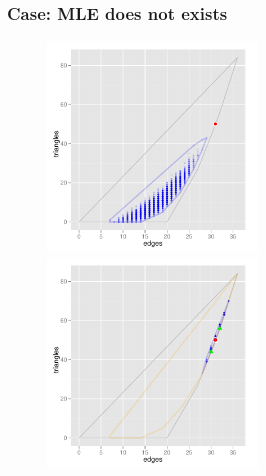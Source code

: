 \documentclass[slidestop,compress, 10pt]{beamer}
\begin{document}
\frame
{
\frametitle{Case: MLE does not exists}  
\begin{figure}[h]
\centering
\includegraphics[height=2.2in]{MCsample-boundary}
\includegraphics[height=2.2in]{MCsample-77face}
\label{F:MCsample-MLE nonexistent}
\end{figure}
}
\end{document}
